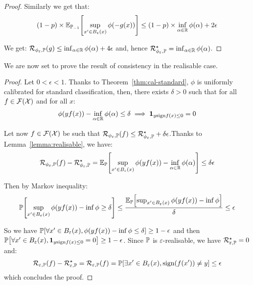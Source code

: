 \begin{proof}
Similarly we get that:
\begin{align*}
(1-p)\times\EE_{\PP_{-1}}\left[\sup_{x'\in B_\varepsilon(x)}\phi(-g(x))\right] \leq(1-p)\times\inf_{\alpha\in\RR}\phi(\alpha)+2\epsilon
\end{align*}

We get: $\mathcal{R}_{\phi_\varepsilon,\mathbb{P}}(g)\leq \inf_{\alpha\in\mathbb{R}}\phi(\alpha)+4\epsilon$ and, hence $\mathcal{R}^\star_{\phi_\varepsilon,\mathbb{P}}=\inf_{\alpha\in\mathbb{R}}\phi(\alpha)$.
\end{proof}



We are now set to prove the result of consistency in the realisable case.
\begin{proof}
Let $0<\epsilon<1$. Thanks to Theorem~\ref{thm:cal-standard}, $\phi$ is uniformly calibrated for standard classification, then, there exists $\delta>0$ such that for all $f\in\mathcal{F}(\mathcal{X})$ and for all $x$:
\begin{align*}
    \phi(yf(x))-\inf_{\alpha\in\mathbb{R}}\phi(\alpha)\leq \delta \implies \mathbf{1}_{y\text{sign}f(x)\leq 0} = 0
\end{align*}

Let now $f\in\mathcal{F}(\mathcal{X})$ be such that  $\mathcal{R}_{\phi_\varepsilon,\mathbb{P}}(f)\leq \mathcal{R}_{\phi_\varepsilon,\mathbb{P}}^\star+\delta\epsilon$.Thanks to Lemma~\ref{lemma:realisable},  we have:
\begin{align*}
\risk_{\phi_\varepsilon,\PP}(f)- \risk_{\phi_\varepsilon,\PP}^\star = \EE_{\PP}\left[\sup_{x'\in B_\varepsilon(x)}\phi(yf(x))-\inf_{\alpha \in \RR} \phi(\alpha)\right]\leq\delta\epsilon
\end{align*}

Then by Markov inequality:
\begin{align*}
    \PP\left[\sup_{x'\in B_\varepsilon(x)}\phi(yf(x))-\inf \phi\geq\delta\right]\leq\frac{\EE_{\PP}\left[\sup_{x'\in B_\varepsilon(x)}\phi(yf(x))-\inf \phi\right]}{\delta}\leq \epsilon
\end{align*}

So we have $\PP\left[\forall x'\in B_\varepsilon(x),\phi(yf(x))-\inf \phi\leq\delta\right]\geq1-\epsilon$ and then $\PP\left[\forall x'\in B_\varepsilon(x),\mathbf{1}_{y\text{sign}f(x)\leq 0} = 0\right]\geq1-\epsilon$. Since $\mathbb{P}$ is $\varepsilon$-realisable, we have $\mathcal{R}_{\varepsilon,\mathbb{P}}^\star=0$ and:
\begin{align*}
        \risk_{\varepsilon,\PP}(f)- \risk_{\varepsilon,\PP}^\star =  \risk_{\varepsilon,\PP}(f) =\PP\left[\exists x'\in B_\varepsilon(x), \text{sign}(f(x'))\neq y\right]\leq \epsilon
\end{align*}
which concludes the proof.
\end{proof}




